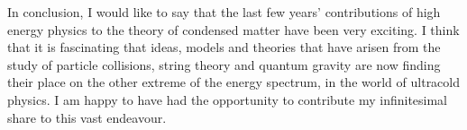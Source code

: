     \indent In conclusion, I would like to say that the last few years' contributions of high energy physics to the theory of condensed matter have been very exciting. I think that it is fascinating that ideas, models and theories that have arisen from the study of particle collisions, string theory and quantum gravity are now finding their place on the other extreme of the energy spectrum, in the world of ultracold physics. I am happy to have had the opportunity to contribute my infinitesimal share to this vast endeavour.

